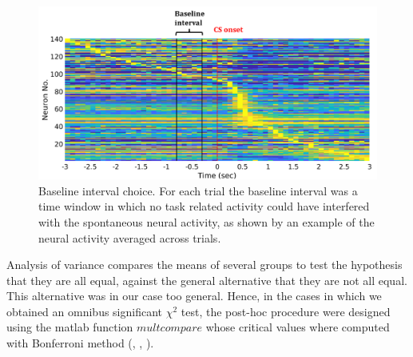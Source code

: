 \begin{figure}
    \centering
    \includegraphics[scale=0.6]{figures/Baseline.png}
    \caption{Baseline interval choice. For each trial the baseline interval was a time window in which no task related activity could have interfered with the spontaneous neural activity, as shown by an example of the neural activity averaged across trials.}
    \label{fig:Baseline}
\end{figure}
Analysis of variance compares the means of several groups to test the hypothesis that they are all equal, against the general alternative that they are not all equal. This alternative was in our case too general. Hence, in the cases in which we obtained an omnibus significant $\chi^2$ test, the post-hoc procedure were designed using the matlab function $\textit{multcompare}$ whose critical values where computed with Bonferroni method (\cite{Bonferroni}, \cite{Dunn1958}, \cite{Dunn1961}).\\
